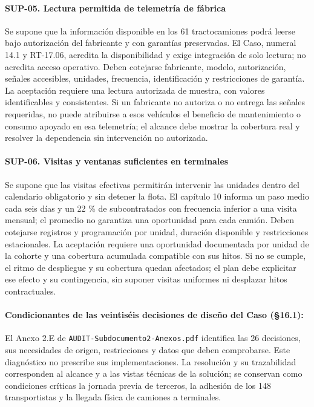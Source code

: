 \paragraph{SUP-05. Lectura permitida de telemetría de fábrica}
Se supone que la información disponible en los 61 tractocamiones podrá leerse bajo autorización del fabricante y con garantías preservadas. El Caso, numeral 14.1 y RT-17.06, acredita la disponibilidad y exige integración de solo lectura; no acredita acceso operativo. Deben cotejarse fabricante, modelo, autorización, señales accesibles, unidades, frecuencia, identificación y restricciones de garantía. La aceptación requiere una lectura autorizada de muestra, con valores identificables y consistentes. Si un fabricante no autoriza o no entrega las señales requeridas, no puede atribuirse a esos vehículos el beneficio de mantenimiento o consumo apoyado en esa telemetría; el alcance debe mostrar la cobertura real y resolver la dependencia sin intervención no autorizada.

\paragraph{SUP-06. Visitas y ventanas suficientes en terminales}
Se supone que las visitas efectivas permitirán intervenir las unidades dentro del calendario obligatorio y sin detener la flota. El capítulo 10 informa un paso medio cada seis días y un 22 \% de subcontratados con frecuencia inferior a una visita mensual; el promedio no garantiza una oportunidad para cada camión. Deben cotejarse registros y programación por unidad, duración disponible y restricciones estacionales. La aceptación requiere una oportunidad documentada por unidad de la cohorte y una cobertura acumulada compatible con sus hitos. Si no se cumple, el ritmo de despliegue y su cobertura quedan afectados; el plan debe explicitar ese efecto y su contingencia, sin suponer visitas uniformes ni desplazar hitos contractuales.

\paragraph{Condicionantes de las veintiséis decisiones de diseño del Caso (§16.1):}
El Anexo 2.E de \texttt{AUDIT-Subdocumento2-Anexos.pdf} identifica las 26 decisiones, sus necesidades de origen, restricciones y datos que deben comprobarse. Este diagnóstico no prescribe sus implementaciones. La resolución y su trazabilidad corresponden al alcance y a las vistas técnicas de la solución; se conservan como condiciones críticas la jornada previa de terceros, la adhesión de los 148 transportistas y la llegada física de camiones a terminales.

